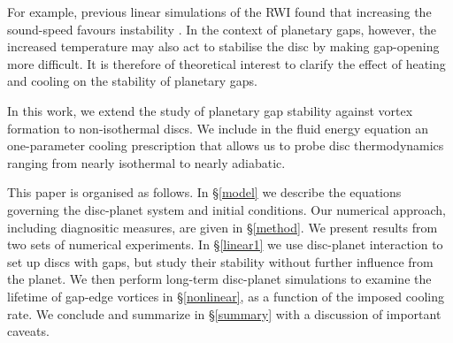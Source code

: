 \documentclass[useAMS,usenatbib]{mn2e}
\begin{document}
For example, previous
linear simulations of the RWI found  
that increasing the sound-speed favours instability \citep{li00,lin13}.  
In the context of
planetary gaps, however, the increased temperature may also act to
stabilise the disc by making gap-opening more difficult. It is 
therefore of theoretical interest to clarify the effect of heating and
cooling on the stability of planetary gaps. 

In this work, we extend the study of planetary gap stability against
vortex formation to non-isothermal discs. We include in the fluid energy
equation an one-parameter cooling prescription that allows us to probe
disc thermodynamics ranging from nearly isothermal to nearly
adiabatic.      

This paper is organised as follows. In \S\ref{model} we describe the
equations governing the disc-planet system and initial conditions. Our
numerical approach, including diagnositic measures, are given in
\S\ref{method}. We present results from two sets of numerical
experiments. In \S\ref{linear1} we use disc-planet interaction to set
up discs with gaps, but study their stability without further
influence from the planet. %
We then perform long-term disc-planet simulations to examine the
lifetime of gap-edge vortices in \S\ref{nonlinear},  
as a function of the imposed cooling rate. We conclude and summarize
in \S\ref{summary} with a discussion of important caveats. 





%






\appendix
%
%
\end{document}
